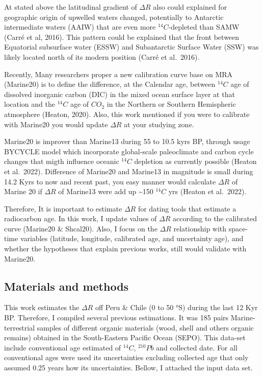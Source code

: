 \documentclass[
]{article}
\begin{document}
At stated above the latitudinal gradient of \(\Delta R\) also could
explained for geographic origin of upwelled waters changed, potentially
to Antarctic intermediate waters (AAIW) that are even more
\(^{14}C\)-depleted than SAMW (Carré et al, 2016). This pattern could be
explained that the front between Equatorial subsurface water (ESSW) and
Subantarctic Surface Water (SSW) was likely located north of its modern
position (Carré et al.~2016).

Recently, Many researchers proper a new calibration curve base on MRA
(Marine20) is to define the difference, at the Calendar age, between
\(^{14}C\) age of dissolved inorganic carbon (DIC) in the mixed ocean
surface layer at that location and the \(^{14}C\) age of \(CO_2\) in the
Northern or Southern Hemispheric atmosphere (Heaton, 2020). Also, this
work mentioned if you were to calibrate with Marine20 you would update
\(\Delta R\) at your studying zone.

Marine20 is improver than Marine13 during 55 to 10.5 kyrs BP, through
usage BYCYCLE model which incorporate global-scale paleoclimate and
carbon cycle changes that migth influence oceanic \(^{14}C\) depletion
as currently possible (Heaton et al.~2022). Difference of Marine20 and
Marine13 in magnitude is small during 14.2 Kyrs to now and recent past,
you easy manner would calculate \(\Delta R\) of Marine 20 if
\(\Delta R\) of Marine13 were add up \textasciitilde150 \(^{14}C\) yrs
(Heaton et al.~2022).

Therefore, It is important to estimate \(\Delta R\) for dating tools
that estimate a radiocarbon age. In this work, I update values of
\(\Delta R\) according to the calibrated curve (Marine20 \& Shcal20).
Also, I focus on the \(\Delta R\) relationship with space-time variables
(latitude, longitude, calibrated age, and uncertainty age), and whether
the hypotheses that explain previous works, still would validate with
Marine20.

\hypertarget{materials-and-methods}{%
\subsection{Materials and methods}\label{materials-and-methods}}

This work estimates the \(\Delta R\) off Peru \& Chile (0 to 50 °S)
during the last 12 Kyr BP. Therefore, I compiled several previous
estimations. It was 185 pairs Marine-terrestrial samples of different
organic materials (wood, shell and others organic remains) obtained in
the South-Eastern Pacific Ocean (SEPO). This data-set include
conventional age estimated of \(^{14}C\), \(^{210}Pb\) and collected
date. For all conventional ages were used its uncertainties excluding
collected age that only assumed 0.25 years how its uncertainties.
Bellow, I attached the input data set.
\end{document}
